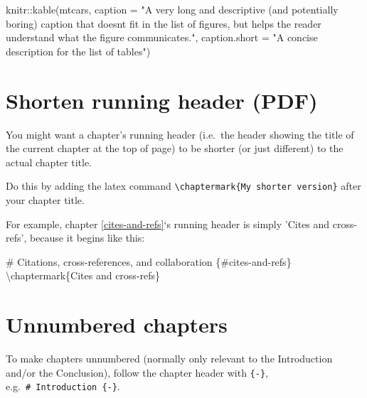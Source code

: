 \documentclass[a4paper, twoside]{templates/ociamthesis}
\newenvironment{Shaded}{\begin{snugshade}}{\end{snugshade}}
\newcommand{\AttributeTok}[1]{\textcolor[rgb]{0.77,0.63,0.00}{#1}}
\newcommand{\FunctionTok}[1]{\textcolor[rgb]{0.00,0.00,0.00}{#1}}
\newcommand{\NormalTok}[1]{#1}
\newcommand{\SpecialCharTok}[1]{\textcolor[rgb]{0.00,0.00,0.00}{#1}}
\newcommand{\StringTok}[1]{\textcolor[rgb]{0.31,0.60,0.02}{#1}}
\renewenvironment{Shaded}
{
  \vspace{10pt}%
  \begin{snugshade}%
}{%
  \end{snugshade}%
  \vspace{8pt}%
}
\begin{document}
\begin{Shaded}
\begin{Highlighting}[]
\NormalTok{knitr}\SpecialCharTok{::}\FunctionTok{kable}\NormalTok{(mtcars,}
              \AttributeTok{caption =} \StringTok{"A very long and descriptive (and potentially}
\StringTok{              boring) caption that doesn\textquotesingle{}t fit in the list of figures,}
\StringTok{              but helps the reader understand what the figure }
\StringTok{              communicates."}\NormalTok{,}
              \AttributeTok{caption.short =} \StringTok{"A concise description for the list of tables"}\NormalTok{)}
\end{Highlighting}
\end{Shaded}

\hypertarget{shorten-running-header-pdf}{%
\section{Shorten running header (PDF)}\label{shorten-running-header-pdf}}

You might want a chapter's running header (i.e.~the header showing the title of the current chapter at the top of page) to be shorter (or just different) to the actual chapter title.

Do this by adding the latex command \texttt{\textbackslash{}chaptermark\{My\ shorter\ version\}} after your chapter title.

For example, chapter \ref{cites-and-refs}`s running header is simply 'Cites and cross-refs', because it begins like this:

\begin{Shaded}
\begin{Highlighting}[]
\FunctionTok{\# Citations, cross{-}references, and collaboration \{\#cites{-}and{-}refs\} }
\NormalTok{\textbackslash{}chaptermark\{Cites and cross{-}refs\}}
\end{Highlighting}
\end{Shaded}

\hypertarget{unnumbered-chapters}{%
\section{Unnumbered chapters}\label{unnumbered-chapters}}

To make chapters unnumbered (normally only relevant to the Introduction and/or the Conclusion), follow the chapter header with \texttt{\{-\}}, e.g.~\texttt{\#\ Introduction\ \{-\}}.
\end{document}

